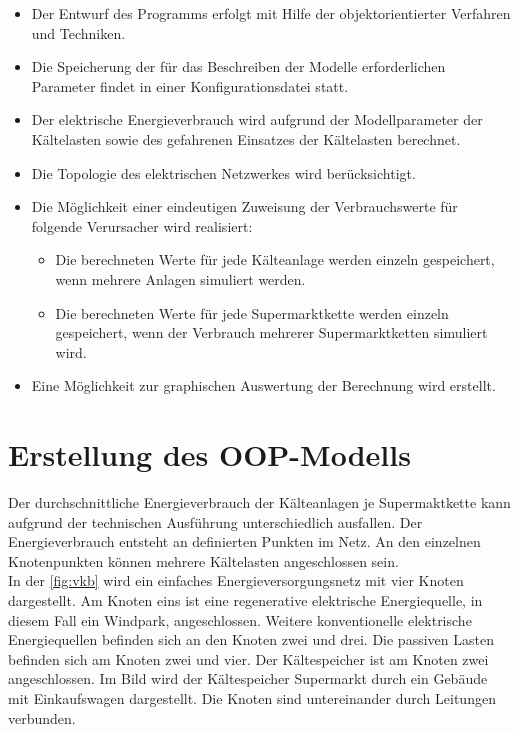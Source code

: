 \begin{itemize}
	\item Der Entwurf des Programms erfolgt mit Hilfe der objektorientierter
	Verfahren und Techniken.
	\item Die Speicherung der f\"ur das Beschreiben der Modelle
	erforderlichen Parameter findet in einer Konfigurationsdatei statt.
	\item Der elektrische Energieverbrauch wird aufgrund der Modellparameter
	der Kältelasten sowie des gefahrenen Einsatzes der Kältelasten
	berechnet.
	\item Die Topologie des elektrischen Netzwerkes wird ber\"ucksichtigt.
	\item Die M\"oglichkeit einer eindeutigen Zuweisung der Verbrauchswerte
	f\"ur folgende Verursacher wird realisiert:
	\begin{itemize}
		\item Die berechneten Werte f\"ur jede K\"alteanlage werden
		einzeln gespeichert, wenn mehrere Anlagen simuliert werden.
		\item Die berechneten Werte f\"ur jede Supermarktkette werden
		einzeln gespeichert, wenn der Verbrauch mehrerer
		Supermarktketten simuliert wird.
	\end{itemize}
	\item Eine M\"oglichkeit zur graphischen Auswertung der Berechnung wird
	erstellt.
\end{itemize}



\section{Erstellung des OOP-Modells}

Der durchschnittliche Energieverbrauch der Kälteanlagen je Supermaktkette
kann aufgrund der technischen Ausführung unterschiedlich ausfallen. Der
Energieverbrauch entsteht an definierten Punkten im Netz. An den einzelnen
Knotenpunkten können mehrere Kältelasten angeschlossen sein.\\

In der \cref{fig:vkb} wird ein einfaches Energieversorgungsnetz mit vier Knoten
dargestellt. Am Knoten eins ist eine regenerative elektrische Energiequelle, in
diesem Fall ein Windpark, angeschlossen. Weitere konventionelle elektrische
Energiequellen befinden sich an den Knoten zwei und drei. Die passiven Lasten
befinden sich am Knoten zwei und vier. Der Kältespeicher ist am Knoten zwei
angeschlossen. Im Bild wird der Kältespeicher Supermarkt durch ein Geb\"aude
mit Einkaufswagen dargestellt. Die Knoten sind untereinander durch Leitungen
verbunden.

